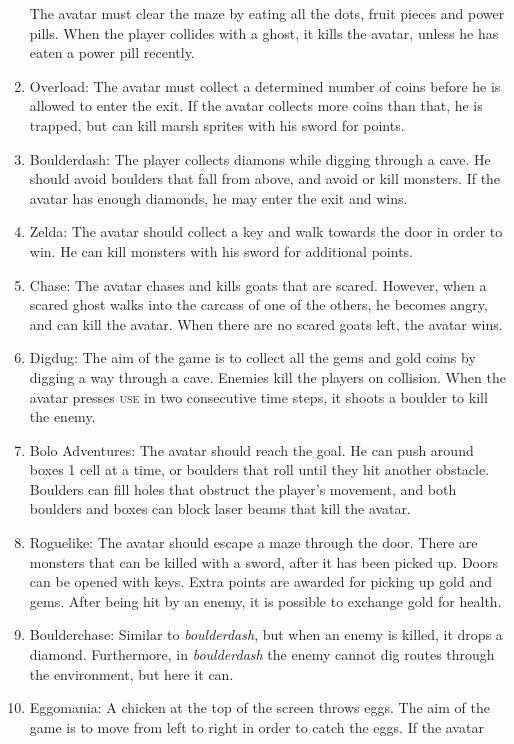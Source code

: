 \begin{enumerate}
		The avatar must clear the maze by eating all the dots, fruit pieces and
		power pills.  When the player collides with a ghost, it kills the
		avatar, unless he has eaten a power pill recently.
	\item Overload:
		The avatar must collect a determined number of coins before he is
		allowed to enter the exit. If the avatar collects more coins than that,
		he is trapped, but can kill marsh sprites with his sword for points.
	\item Boulderdash:
		The player collects diamons while digging through a cave. He should
		avoid boulders that fall from above, and avoid or kill monsters. If the
		avatar has enough diamonds, he may enter the exit and wins.
	\item Zelda:
		The avatar should collect a key and walk towards the door in order to
		win. He can kill monsters with his sword for additional points.
	\item Chase:
		The avatar chases and kills goats that are scared. However, when a
		scared ghost walks into the carcass of one of the others, he becomes
		angry, and can kill the avatar. When there are no scared goats left, the
		avatar wins.
	\item Digdug:
		The aim of the game is to collect all the gems and gold coins by digging
		a way through a cave. Enemies kill the players on collision. When the
		avatar presses \textsc{use} in two consecutive time steps, it shoots a boulder to
		kill the enemy.
	\item Bolo Adventures:
		The avatar should reach the goal. He can push around boxes 1 cell at a
		time, or boulders that roll until they hit another obstacle. Boulders
		can fill holes that obstruct the player's movement, and both boulders
		and boxes can block laser beams that kill the avatar.
	\item Roguelike:
		The avatar should escape a maze through the door. There are monsters
		that can be killed with a sword, after it has been picked up. Doors can
		be opened with keys. Extra points are awarded for picking up gold and
		gems. After being hit by an enemy, it is possible to exchange gold for
		health.
	\item Boulderchase:
		Similar to \textit{boulderdash}, but when an enemy is killed, it drops a
		diamond. Furthermore, in \textit{boulderdash} the enemy cannot dig
		routes through the environment, but here it can.
	\item Eggomania:
		A chicken at the top of the screen throws eggs. The aim of the game is
		to move from left to right in order to catch the eggs. If the avatar

\end{enumerate}
